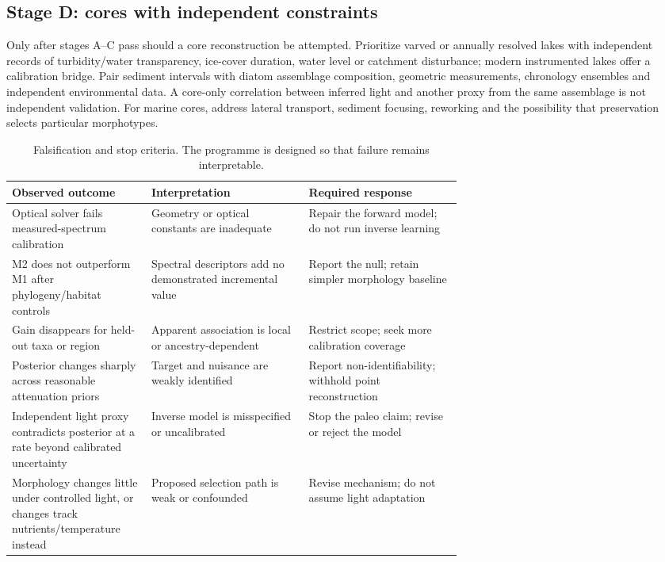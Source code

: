\documentclass[11pt,a4paper]{article}
\begin{document}
\subsection{Stage D: cores with independent constraints}
Only after stages A--C pass should a core reconstruction be attempted. Prioritize varved or annually resolved lakes with independent records of turbidity/water transparency, ice-cover duration, water level or catchment disturbance; modern instrumented lakes offer a calibration bridge. Pair sediment intervals with diatom assemblage composition, geometric measurements, chronology ensembles and independent environmental data. A core-only correlation between inferred light and another proxy from the same assemblage is not independent validation. For marine cores, address lateral transport, sediment focusing, reworking and the possibility that preservation selects particular morphotypes.

\begin{table}[H]
\caption{Falsification and stop criteria. The programme is designed so that failure remains interpretable.}
\label{tab:falsify}
\small\begin{tabularx}{\linewidth}{@{}p{0.31\linewidth}p{0.35\linewidth}X@{}}
\toprule
Observed outcome & Interpretation & Required response \\
\midrule
Optical solver fails measured-spectrum calibration & Geometry or optical constants are inadequate & Repair the forward model; do not run inverse learning \\
M2 does not outperform M1 after phylogeny/habitat controls & Spectral descriptors add no demonstrated incremental value & Report the null; retain simpler morphology baseline \\
Gain disappears for held-out taxa or region & Apparent association is local or ancestry-dependent & Restrict scope; seek more calibration coverage \\
Posterior changes sharply across reasonable attenuation priors & Target and nuisance are weakly identified & Report non-identifiability; withhold point reconstruction \\
Independent light proxy contradicts posterior at a rate beyond calibrated uncertainty & Inverse model is misspecified or uncalibrated & Stop the paleo claim; revise or reject the model \\
Morphology changes little under controlled light, or changes track nutrients/temperature instead & Proposed selection path is weak or confounded & Revise mechanism; do not assume light adaptation \\
\bottomrule\end{tabularx}
\end{table}
\end{document}
